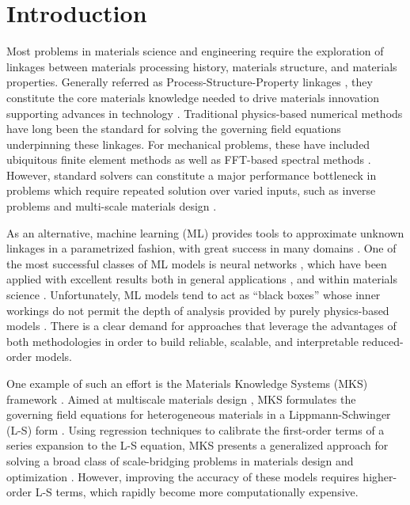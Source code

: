 \documentclass[3p, preprint]{elsarticle}
\begin{document}
\section{Introduction}\label{sec:intro}
Most problems in materials science and engineering require the exploration of  linkages between materials processing history, materials structure, and materials properties. Generally referred as Process-Structure-Property linkages \cite{kalidindiMatin}, they constitute the core materials knowledge needed to drive materials innovation supporting advances in technology \cite{mgi_plan_2014}. Traditional physics-based numerical methods have long been the standard for solving the governing field equations underpinning these linkages. For mechanical problems, these have included ubiquitous finite element methods \cite{morton_mayers_2005, roters2010_fea, mowei_2007_cahn, mcdowell2009} as well as FFT-based spectral methods \cite{moulinec1998, de_Geus_2017, michel2001_fft}. However, standard solvers can constitute a major performance bottleneck in problems which require repeated solution over varied inputs, such as inverse problems \cite{sneider2001, wu_2007_closure, jain2014} and multi-scale materials design \cite{Parno_2016, horstemeyer_2009, chen2020}. 

As an alternative, machine learning (ML) provides tools to approximate unknown linkages in a parametrized fashion, with great success in many domains \cite{carleo_2019physicsML}. One of the most successful classes of ML models is neural networks \cite{Schmidhuber_2015}, which have been applied with excellent results both in general applications \cite{carleo_2019physicsML, krizhevvsky2012_alexnet, adler2018, He_resnet}, and within materials science \cite{chen2020, yang2018Homogenization, yang2019,  Schmidt2019RecentAA}. Unfortunately, ML models tend to act as ``black boxes'' whose inner workings do not permit the depth of analysis provided by purely physics-based models \cite{buhrmester2019analysis}. There is a clear demand for approaches that leverage the advantages of both methodologies in order to build reliable, scalable, and interpretable reduced-order models. 

One example of such an effort is the Materials Knowledge Systems (MKS) framework \cite{brough2016_mks, Latypov2018MaterialsKS}. Aimed at multiscale materials design \cite{kalidindi_bayes_2019, kalidindi2019_ela}, MKS formulates the governing field equations for heterogeneous materials in a Lippmann-Schwinger (L-S) form \cite{moulinec1998, lippmannschwinger}. Using regression techniques to calibrate the first-order terms of a series expansion to the L-S equation, MKS presents a generalized approach for solving a broad class of scale-bridging problems in materials design and optimization \cite{ brough2017, priddy2017}. However, improving the accuracy of these models requires higher-order L-S terms, which rapidly become more computationally expensive.
\end{document}
